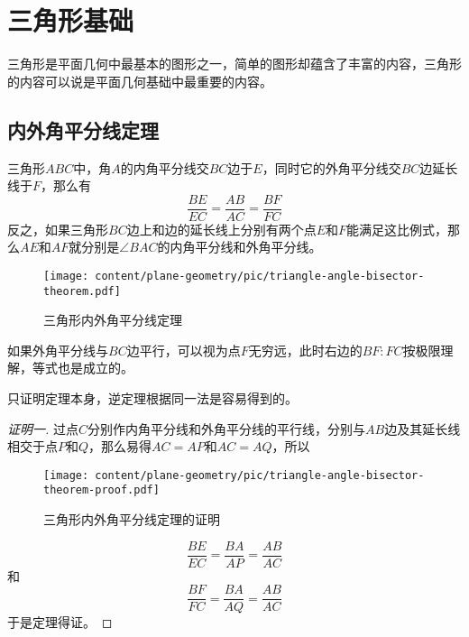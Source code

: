 
\section{三角形基础}
\label{sec:triangle-base-discussion}

三角形是平面几何中最基本的图形之一，简单的图形却蕴含了丰富的内容，三角形的内容可以说是平面几何基础中最重要的内容。

\subsection{内外角平分线定理}
\label{sec:triangle-angle-bisector-theorem}

\begin{theorem}[三角形内外角平分线定理]
  三角形$ABC$中，角$A$的内角平分线交$BC$边于$E$，同时它的外角平分线交$BC$边延长线于$F$，那么有
  \begin{equation}
    \label{eq:triangle-angle-bisector-theorem}
    \frac{BE}{EC} = \frac{AB}{AC} = \frac{BF}{FC}
  \end{equation}
  反之，如果三角形$BC$边上和边的延长线上分别有两个点$E$和$F$能满足这比例式，那么$AE$和$AF$就分别是$\angle BAC$的内角平分线和外角平分线。
\end{theorem}

\begin{figure}[htbp]
\centering
\texttt{[image: content/plane-geometry/pic/triangle-angle-bisector-theorem.pdf]}
\caption{三角形内外角平分线定理}
\label{fig:triangle-angle-bisector-theorem}
\end{figure}

如果外角平分线与$BC$边平行，可以视为点$F$无穷远，此时右边的$BF : FC$按极限理解，等式也是成立的。

只证明定理本身，逆定理根据同一法是容易得到的。

\begin{proof}[证明一]
  过点$C$分别作内角平分线和外角平分线的平行线，分别与$AB$边及其延长线相交于点$P$和$Q$，那么易得$AC=AP$和$AC=AQ$，所以

\begin{figure}[htbp]
\centering
\texttt{[image: content/plane-geometry/pic/triangle-angle-bisector-theorem-proof.pdf]}
\caption{三角形内外角平分线定理的证明}
\label{fig:triangle-angle-bisector-theorem-proof}
\end{figure}

  \begin{equation*}
    \frac{BE}{EC} = \frac{BA}{AP} = \frac{AB}{AC}
  \end{equation*}
  和
  \begin{equation*}
    \frac{BF}{FC} = \frac{BA}{AQ} = \frac{AB}{AC}
  \end{equation*}
于是定理得证。
\end{proof}

